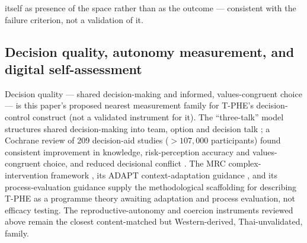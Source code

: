 \documentclass[11pt]{article}
\newcommand{\tphe}{T\mbox{-}PHE}
\begin{document}
itself as presence of the space rather than as the outcome --- consistent with the failure criterion, not a validation of it.

\subsection{Decision quality, autonomy measurement, and digital self-assessment}
Decision quality --- shared decision-making and informed, values-congruent choice --- is this paper's proposed nearest measurement family for \tphe{}'s decision-control construct (not a validated instrument for it). The ``three-talk'' model structures shared decision-making into team, option and decision talk \cite{ref15}; a Cochrane review of 209 decision-aid studies ($>107{,}000$ participants) found consistent improvement in knowledge, risk-perception accuracy and values-congruent choice, and reduced decisional conflict \cite{ref14}. The MRC complex-intervention framework \cite{ref52}, its ADAPT context-adaptation guidance \cite{ref53}, and its process-evaluation guidance \cite{ref54} supply the methodological scaffolding for describing \tphe{} as a programme theory awaiting adaptation and process evaluation, not efficacy testing. The reproductive-autonomy and coercion instruments reviewed above \cite{ref16,ref17,ref18} remain the closest content-matched but Western-derived, Thai-unvalidated, family.
\end{document}

